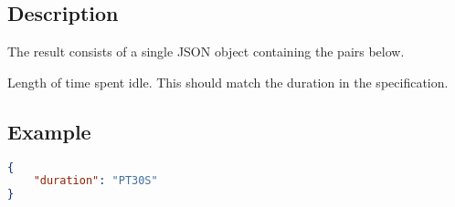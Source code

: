 \documentclass[10pt]{article}
\begin{document}
\subsection{Description}
The result consists of a single JSON object containing the pairs
below.  \seejson

 Length of time spent idle.  This should
match the duration in the specification.


\subsection{Example}
\begin{lstlisting}[language=json]
{
    "duration": "PT30S"
}
\end{lstlisting}
\end{document}
